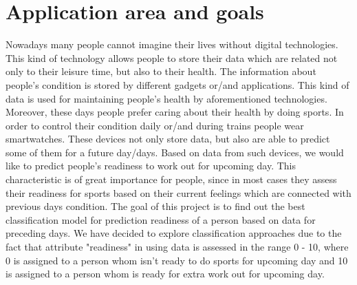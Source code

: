 \section{Application area and goals}
Nowadays many people cannot imagine their lives without digital technologies. This kind of technology allows people to store their data which are related not only to their leisure time, but also to their health. The information about people's condition is stored by different gadgets or/and applications. This kind of data is used for maintaining people's health by aforementioned technologies. Moreover, these days people prefer caring about their health by doing sports. In order to control their condition daily or/and during trains people  wear smartwatches. These devices not only store data, but also are able to predict some of them for a future day/days. Based on data from such devices, we would like to predict people's readiness to work out for upcoming day. This characteristic is of great importance for people, since in most cases they assess their readiness for sports based on their current feelings which are connected with previous days condition. The goal of this project is to find out the best classification model for prediction readiness of a person based on data for preceding days. We have decided to explore classification approaches due to the fact that attribute "readiness" in using data is assessed in the range 0 - 10, where 0 is assigned to a person whom isn't ready to do sports for upcoming day and 10 is assigned to a person whom is ready for extra work out for upcoming day.
